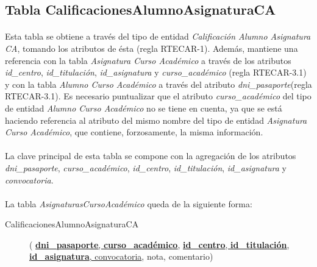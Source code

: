    \subsection{Tabla CalificacionesAlumnoAsignaturaCA}

      \paragraph{}Esta tabla se obtiene a través del tipo de entidad
      \textit{Calificación Alumno Asignatura CA}, tomando los atributos de ésta
      (regla RTECAR-1). Además, mantiene una referencia con la tabla
      \textit{Asignatura Curso Académico} a través de los atributos
      \textit{id\_centro}, \textit{id\_titulación}, \textit{id\_asignatura} y
      \textit{curso\_académico} (regla RTECAR-3.1) y con la tabla
      \textit{Alumno Curso Académico} a través del atributo
      \textit{dni\_pasaporte}(regla RTECAR-3.1). Es necesario puntualizar que el
      atributo \textit{curso\_académico} del tipo de entidad \textit{Alumno Curso
      Académico} no se tiene en cuenta, ya que se está haciendo referencia al
      atributo del mismo nombre del tipo de entidad \textit{Asignatura Curso
      Académico}, que contiene, forzosamente, la misma información.

      \paragraph{}La clave principal de esta tabla se compone con la agregación
      de los atributos \textit{dni\_pasaporte}, \textit{curso\_académico},
      \textit{id\_centro}, \textit{id\_titulación}, \textit{id\_asignatura} y
      \textit{convocatoria}.

      \paragraph{}La tabla \textit{AsignaturasCursoAcadémico} queda de la
      siguiente forma:

      \begin{description}
         \item[CalificacionesAlumnoAsignaturaCA] \begin{flushleft}(         \underline{\textbf{dni\_pasaporte}, \textbf{curso\_académico},}
         \underline{\textbf{id\_centro}, \textbf{id\_titulación},
         \textbf{id\_asignatura}, convocatoria}, nota, comentario)
         \end{flushleft}
      \end{description}
